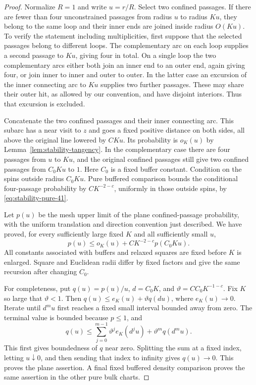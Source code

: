 \begin{proof}
Normalize $R=1$ and write $u=r/R$.  Select two confined passages.
If there are fewer than four unconstrained passages from radius
$u$ to radius $Ku$, they belong to the same loop and their inner
ends are joined inside radius $O(Ku)$.  To verify the statement
including multiplicities, first suppose that the selected passages
belong to different loops.  The complementary arc on each loop
supplies a second passage to $Ku$, giving four in total.  On a
single loop the two complementary arcs either both join an inner
end to an outer end, again giving four, or join inner to inner and
outer to outer.  In the latter case an excursion of the inner
connecting arc to $Ku$ supplies two further passages.  These may
share their outer hit, as allowed by our convention, and have
disjoint interiors.  Thus that excursion is excluded.

Concatenate the two confined passages and their inner connecting
arc.  This subarc has a near visit to $z$ and goes a fixed positive
distance on both sides, all above the original line lowered by
$CKu$.  Its probability is $o_K(u)$ by
Lemma~\ref{lem:stability-tangency}.  In the complementary case there
are four passages from $u$ to $Ku$, and the original confined
passages still give two confined passages from $C_0Ku$ to $1$.
Here $C_0$ is a fixed buffer constant.  Condition on the spins
outside radius $C_0Ku$.  Pure buffered comparison bounds the
conditional four-passage probability by $CK^{-2-c}$, uniformly in
those outside spins, by \eqref{eq:stability-pure-41}.

Let $p(u)$ be the mesh upper limit of the plane confined-passage
probability, with the uniform translation and direction convention
just described.  We have proved, for every sufficiently large fixed
$K$ and all sufficiently small $u$,
\begin{equation}
 p(u)\leq o_K(u)+CK^{-2-c}p(C_0Ku).
 \label{eq:stability-half-recursion}
\end{equation}
All constants associated with buffers and relaxed squares are fixed
before $K$ is enlarged.  Square and Euclidean radii differ by fixed
factors and give the same recursion after changing $C_0$.

For completeness, put $q(u)=p(u)/u$, $d=C_0K$, and
$\vartheta=CC_0K^{-1-c}$.  Fix $K$ so large that $\vartheta<1$.
Then $q(u)\leq e_K(u)+\vartheta q(du)$, where $e_K(u)\to0$.
Iterate until $d^mu$ first reaches a fixed small interval bounded
away from zero.  The terminal value is bounded because $p\leq1$,
and
\[
 q(u)\leq\sum_{j=0}^{m-1}\vartheta^j e_K(d^ju)
                 +\vartheta^m q(d^mu).
\]
This first gives boundedness of $q$ near zero.  Splitting the sum
at a fixed index, letting $u\downarrow0$, and then sending that
index to infinity gives $q(u)\to0$.  This proves the plane
assertion.  A final fixed buffered density comparison proves the
same assertion in the other pure bulk charts.
\end{proof}

